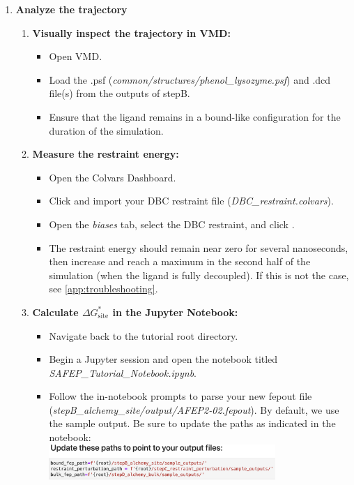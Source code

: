 \documentclass[9pt,tutorial]{Styling/livecoms}
\newcommand{\filepath}[1]{\textit{#1}}
\newcommand{\button}[1]{\inlineBox[gray]{\texttt{#1}}}
\newcommand{\menu}[1]{\textit{#1}}
\begin{document}
\begin{enumerate}
    \item \textbf{Analyze the trajectory}

    
    \begin{enumerate}[label=\alph*., ref=\theenumi.\alph*] \label{step:analyzeSite}
        \item \textbf{Visually inspect the trajectory in VMD:}
        \begin{itemize}
            \item Open VMD.
            \item Load the .psf (\filepath{common/structures/phenol\_lysozyme.psf}) and .dcd file(s) from the outputs of stepB.
            \item Ensure that the ligand remains in a bound-like configuration for the duration of the simulation.
        \end{itemize}
        \item \textbf{Measure the restraint energy:} 
        \begin{itemize}
            \item Open the Colvars Dashboard.
            \item Click \button{Load} and import your DBC restraint file (\filepath{DBC\_restraint.colvars}).
            \item Open the \menu{biases} tab, select the DBC restraint, and click \button{Energy Timeline}.
            \item The restraint energy should remain near zero for several nanoseconds, then increase and reach a maximum in the second half of the simulation (when the ligand is fully decoupled). If this is not the case, see \ref{app:troubleshooting}.
        \end{itemize}
        \item \textbf{Calculate $\Delta G^*_{\mathrm{site}}$ in the Jupyter Notebook:} \label{step:opennotebook}
        \begin{itemize}
            \item Navigate back to the tutorial root directory.
            \item Begin a Jupyter session and open the notebook titled \filepath{SAFEP\_Tutorial\_Notebook.ipynb}.
            \item Follow the in-notebook prompts to parse your new fepout file  (\filepath{stepB\_alchemy\_site/output/AFEP2-02.fepout}). By default, we use the sample output. Be sure to update the paths as indicated in the notebook:\\ \includegraphics[width=0.75\textwidth, trim={0 0 0 4cm},clip]{update_paths.png}

\end{itemize}
\end{enumerate}
\end{enumerate}
\end{document}
